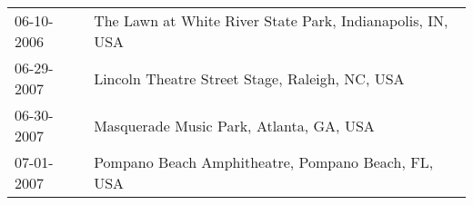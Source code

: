 \begin{supertabular}{ll}
 06-10-2006 &  The Lawn at White River State Park, Indianapolis, IN, USA \\
 06-29-2007 &             Lincoln Theatre Street Stage, Raleigh, NC, USA \\
 06-30-2007 &                    Masquerade Music Park, Atlanta, GA, USA \\
 07-01-2007 &         Pompano Beach Amphitheatre, Pompano Beach, FL, USA \\
\end{supertabular}
